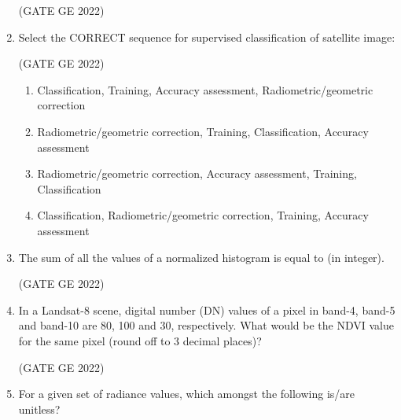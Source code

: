\documentclass[journal,12pt,onecolumn]{IEEEtran}
\theoremstyle{remark}
\begin{document}
\begin{enumerate}
\hfill (GATE GE 2022)

\begin{enumerate}
\end{enumerate}

\item Select the CORRECT sequence for supervised classification of satellite image:

\hfill (GATE GE 2022)

\begin{enumerate}
    \item Classification, Training, Accuracy assessment, Radiometric/geometric correction
    \item Radiometric/geometric correction, Training, Classification, Accuracy assessment
    \item Radiometric/geometric correction, Accuracy assessment, Training, Classification
    \item Classification, Radiometric/geometric correction, Training, Accuracy assessment
\end{enumerate}

\item The sum of all the values of a normalized histogram is equal to \makebox[1cm]{\hrulefill} (in integer).

\hfill (GATE GE 2022)

\item In a Landsat-8 scene, digital number (DN) values of a pixel in band-4, band-5 and band-10 are 80, 100 and 30, respectively. What would be the NDVI value for the same pixel (round off to 3 decimal places)?

\hfill (GATE GE 2022)

\begin{enumerate}
\end{enumerate}

\item For a given set of radiance values, which amongst the following is/are unitless?


\end{enumerate}
\end{document}
